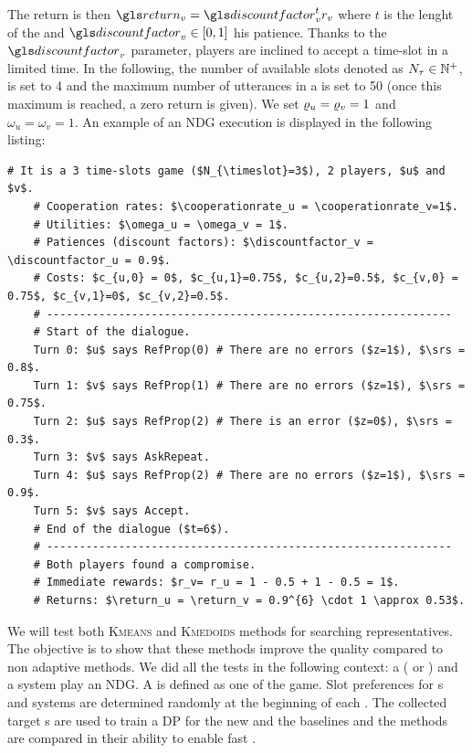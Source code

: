 The return is then $\return_v =  \discountfactor_v^{t} r_v$ where $t$ is the lenght of the  and $\discountfactor_v \in [0,1]$ his patience. Thanks to the $\discountfactor_v$ parameter, players are inclined to accept a time-slot in a limited time. In the following, the number of available slots denoted as $N_{\tau} \in \mathbb{N}^+$, is set to 4 and the maximum number of utterances in a  is set to 50 (once this maximum is reached, a zero return is given). We set $\varrho_u = \varrho_v=1$ and $\omega_u = \omega_v = 1$. An example of an \gls{NDG} execution is displayed in the following listing:\\

\begin{lstlisting}[mathescape=true,label={lst:ndg},title={Example of an \gls{NDG} execution.},breaklines,captionpos=b,numbers=none]
    # It is a 3 time-slots game ($N_{\timeslot}=3$), 2 players, $u$ and $v$.
    # Cooperation rates: $\cooperationrate_u = \cooperationrate_v=1$.
    # Utilities: $\omega_u = \omega_v = 1$.
    # Patiences (discount factors): $\discountfactor_v = \discountfactor_u = 0.9$.
    # Costs: $c_{u,0} = 0$, $c_{u,1}=0.75$, $c_{u,2}=0.5$, $c_{v,0} = 0.75$, $c_{v,1}=0$, $c_{v,2}=0.5$.
    # --------------------------------------------------------------
    # Start of the dialogue.
    Turn 0: $u$ says RefProp(0) # There are no errors ($z=1$), $\srs = 0.8$.
    Turn 1: $v$ says RefProp(1) # There are no errors ($z=1$), $\srs = 0.75$.
    Turn 2: $u$ says RefProp(2) # There is an error ($z=0$), $\srs = 0.3$.
    Turn 3: $v$ says AskRepeat.
    Turn 4: $u$ says RefProp(2) # There are no errors ($z=1$), $\srs = 0.9$.
    Turn 5: $v$ says Accept.
    # End of the dialogue ($t=6$).
    # --------------------------------------------------------------
    # Both players found a compromise.
    # Immediate rewards: $r_v= r_u = 1 - 0.5 + 1 - 0.5 = 1$.
    # Returns: $\return_u = \return_v = 0.9^{6} \cdot 1 \approx 0.53$.

\end{lstlisting}

We will test both \textsc{Kmeans} and \textsc{Kmedoids} methods for searching representatives. The objective is to show that these methods improve the  quality compared to non adaptive methods. We did all the tests in the following context: a  ( or ) and a system play an \gls{NDG}. A  is defined as one  of the game. Slot preferences for s and systems are determined randomly at the beginning of each . The collected target s are used to train a \gls{DP} for the new  and the baselines and the  methods are compared in their ability to enable fast .

